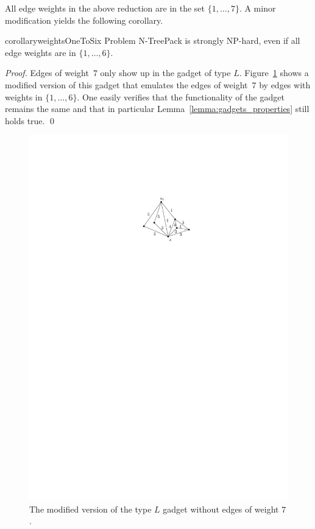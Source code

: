 \documentclass[runningheads]{llncs}
\newcommand{\set}[1]{\{ #1 \}}
\newcommand{\fromto}[2]{\set{#1, \ldots, #2}}
\newcommand{\xxxNTP}{{\sc N-TreePack}}
\begin{document}
All edge weights in the above reduction are in the set $\fromto{1}{7}$.
A minor modification yields the following corollary.
\begin{restatable}{corollary}{weightsOneToSix}
\label{coro:small-weights}
Problem {\xxxNTP} is strongly NP-hard, even if all edge weights are in $\fromto{1}{6}$.
\end{restatable}
\begin{proof}
Edges of weight~$7$ only show up in the gadget of type $L$.
Figure~\ref{fig_hamilton_cycle_improved} shows a modified version of this gadget that emulates 
the edges of weight~$7$ by edges with weights in $\fromto{1}{6}$.
One easily verifies that the functionality of the gadget remains the same and that in particular
Lemma~\ref{lemma:gadgets_properties} still holds true.
\qed
\end{proof}
\begin{figure}[htpb]
\centering
\includegraphics[scale=1.1]{img/act-hamilton-cycle-b}
\caption{The modified version of the type $L$ gadget without edges of weight $7$.}
\label{fig_hamilton_cycle_improved}
\end{figure}
\end{document}
